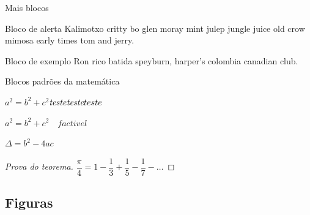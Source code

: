 \documentclass[
	brazilian, %
	14pt, %
]{beamer}
\begin{document}
\begin{frame}{Mais blocos}
	\begin{alertblock}{Bloco de alerta}
		Kalimotxo critty bo glen moray mint julep jungle juice old crow mimosa early times tom and jerry. 
	\end{alertblock}
		
	\begin{exampleblock}{Bloco de exemplo}
		Ron rico batida speyburn, harper's colombia canadian club.
	\end{exampleblock}
\end{frame}

\begin{frame}{Blocos padrões da matemática}
	\begin{theorem}
		$ a^2 = b^2 + c^2$\hfill$\mathit{teste}\textit{\rmfamily teste}teste$
	\end{theorem}
	
	\begin{theorem}
		$ a^2 = b^2 + c^2\quad factivel$%
	\end{theorem}
	
	\begin{corollary}
		$\Delta = b^2 - 4ac$
	\end{corollary}
	
	\begin{proof}[Prova do teorema]
		$\dfrac{\pi}{4} = 1 - \dfrac{1}{3} + \dfrac{1}{5} - \dfrac{1}{7} -\ldots$
	\end{proof}
\end{frame}

\subsection{Figuras}
\end{document}

